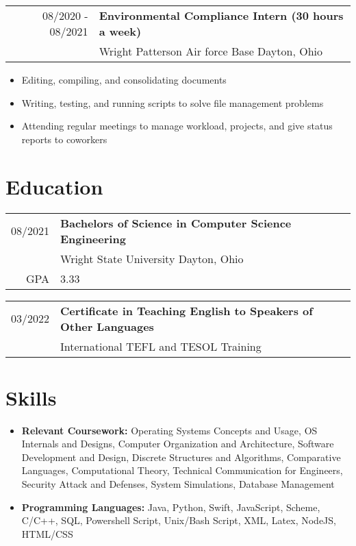 \documentclass[12pt,a4paper,roman]{moderncv}        %
\begin{document}
\begin{tabular}{rl}	
\textsc{08/2020 - 08/2021} & \textbf{Environmental Compliance Intern (30 hours a week) } \\
\textit{} & Wright Patterson Air force Base Dayton, Ohio\\
\end{tabular}
\begin{itemize}
  \item Editing, compiling, and consolidating documents
  \item Writing, testing, and running scripts to solve file management problems
  \item Attending regular meetings to manage workload, projects, and give status reports to coworkers
\end{itemize}

\section{Education}
\begin{tabular}{rl}	
\textsc{08/2021} & \textbf{Bachelors of Science in Computer Science Engineering} \\
\textsc{} & Wright State University Dayton, Ohio\\
\textsc{GPA} & 3.33

\end{tabular}

\begin{tabular}{rl}	
\textsc{03/2022} & \textbf{Certificate in Teaching English to Speakers of Other Languages } \\
\textsc{} & International TEFL and TESOL Training\\

\end{tabular}


\section{Skills}
\begin{minipage}{\maincolumnwidth}
	\small{
    	\begin{itemize}
          \item \textbf{Relevant Coursework:} Operating Systems Concepts and Usage, OS Internals and Designs, Computer Organization and Architecture, Software Development and Design, Discrete Structures and Algorithms, Comparative Languages, Computational Theory, Technical Communication for Engineers, Security Attack and Defenses, System Simulations, Database Management \\
          \item \textbf{Programming Languages:} Java, Python, Swift, JavaScript, Scheme, C/C++, SQL, Powershell Script, Unix/Bash Script, XML, Latex,  NodeJS, HTML/CSS \\
		\end{itemize}}
\end{minipage}
\end{document}
